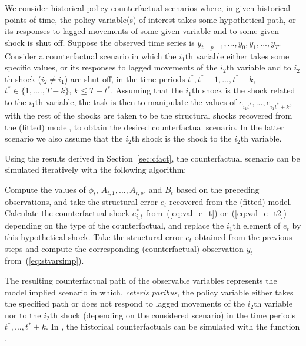 \documentclass[nojss]{jss}
\begin{document}
We consider historical policy counterfactual scenarios where, in given historical points of time, the policy variable(s) of interest takes some hypothetical path, or its responses to lagged movements of some given variable and to some given shock is shut off. Suppose the observed time series is $y_{t-p+1},...,y_0,y_1,...,y_T$. Consider a counterfactual scenario in which the $i_1$th variable either takes some specific values, or its responses to lagged movements of the $i_2$th variable and to $i_2$th shock ($i_2\neq i_1$) are shut off, in the time periods $t^*, t^*+1,...,t^*+k$, $t^*\in\lbrace 1,....,T-k\rbrace$, $k\leq T - t^*$. Assuming that the $i_1$th shock is the shock related to the $i_1$th variable, the task is then to manipulate the values of $e_{i_1t^*},...,e_{i_1t^*+k}$, with the rest of the shocks are taken to be the structural shocks recovered from the (fitted) model, to obtain the desired counterfactual scenario. In the latter scenario we also assume that the $i_2$th shock is the shock to the $i_2$th variable.

Using the results derived in Section~\ref{sec:cfact}, the counterfactual scenario can be simulated iteratively with the following algorithm:
\begin{algorithm}[!ht]
\caption{Historical counterfactual}
\begin{algorithmic}[1]\label{algo:histcount}
    \STATE Compute the values of $\phi_{t}$, $A_{t,1},...,A_{t,p}$, and $B_t$ based on the preceding observations, and take the structural error $e_{t}$ recovered from the (fitted) model.
      \STATE Calculate the counterfactual shock $e_{i_1t}^*$ from~(\ref{eq:val_e_t}) or~(\ref{eq:val_e_t2}) depending on the type of the counterfactual, and replace the $i_1$th element of $e_{t}$ by this hypothetical shock.\label{step:hist_count_shock}
    \ENDIF
    \STATE Take the structural error $e_t$ obtained from the previous steps and compute the corresponding (counterfactual) observation $y_{t}$ from~(\ref{eq:stvarsimp}).
  \ENDFOR
\end{algorithmic}
\end{algorithm}

The resulting counterfactual path of the observable variables represents the model implied scenario in which, \textit{ceteris paribus}, the policy variable either takes the specified path or does not respond to lagged movements of the $i_2$th variable nor to the $i_2$th shock (depending on the considered scenario) in the time periods $t^*,...,t^*+k$. In , the historical counterfactuals can be simulated with the function .
\end{document}
